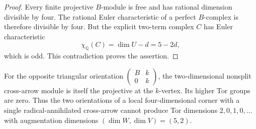 \begin{proof}
Every finite projective $B$-module is free and has rational
dimension divisible by four.  The rational Euler characteristic
of a perfect $B$-complex is therefore divisible by four.  But
the explicit two-term complex $C$ has Euler characteristic
\[
 \chi_{\mathbb Q}(C)=\dim U-d=5-2d,
\]
which is odd.  This contradiction proves the assertion.
\end{proof}

\begin{remark}\label{B:six-local-corner-both-orientations}
For the opposite triangular orientation
$\left(\begin{smallmatrix}B&k\\0&k\end{smallmatrix}\right)$,
the two-dimensional nonsplit cross-arrow module is itself the
projective at the $k$-vertex.  Its higher Tor groups are zero.
Thus the two orientations of a local four-dimensional corner
with a single radical-annihilated cross-arrow cannot produce
Tor dimensions $2,0,1,0,\ldots$ with augmentation dimensions
$(\dim W,\dim V)=(5,2)$.
\end{remark}
